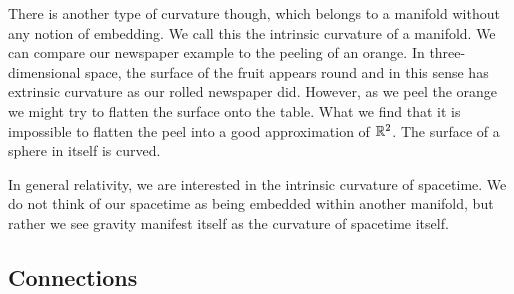 There is another type of curvature though, which belongs to a manifold without any notion of embedding. We call this the intrinsic curvature of a manifold. We can compare our newspaper example to the peeling of an orange. In three-dimensional space, the surface of the fruit appears round and in this sense has extrinsic curvature as our rolled newspaper did. However, as we peel the orange we might try to flatten the surface onto the table. What we find that it is impossible to flatten the peel into a good approximation of ${\mathbb{R}}^2$. The surface of a sphere in itself is curved.

In general relativity, we are interested in the intrinsic curvature of spacetime. We do not think of our spacetime as being embedded within another manifold, but rather we see gravity manifest itself as the curvature of spacetime itself.  

\subsection{Connections}

